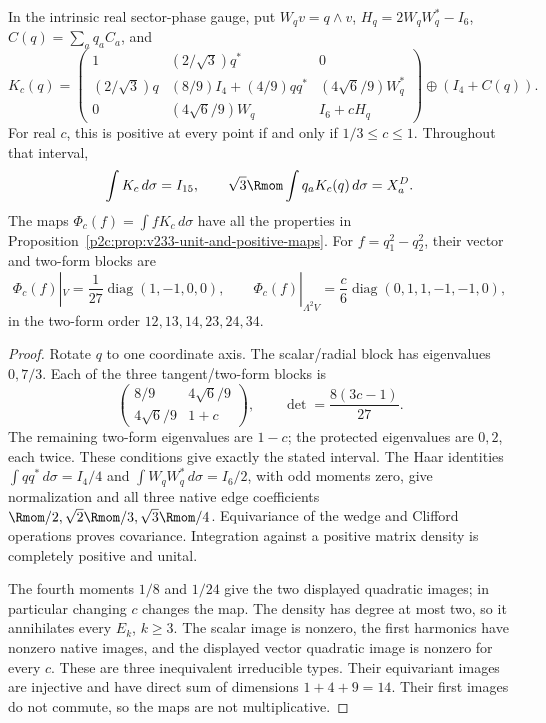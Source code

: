 \documentclass[11pt,a4paper]{article}
\begin{document}
\begin{proposition}
\label{p2c:prop:v233-endpoint-map-family}
In the intrinsic real sector-phase gauge, put
\(W_qv=q\wedge v\), \(H_q=2W_qW_q^*-I_6\),
\(C(q)=\sum_aq_aC_a\), and
\[
 K_c(q)=
 \begin{pmatrix}
 1&(2/\sqrt3)q^*&0\\
 (2/\sqrt3)q&(8/9)I_4+(4/9)qq^*&(4\sqrt6/9)W_q^*\\
 0&(4\sqrt6/9)W_q&I_6+cH_q
 \end{pmatrix}\oplus(I_4+C(q)).
\]
For real \(c\), this is positive at every point if and only if
\(1/3\le c\le1\). Throughout that interval,
\[
 \int K_c\,d\sigma=I_{15},\qquad
 \sqrt3\Rmom\int q_aK_c(q)\,d\sigma=X_a^D .
\]
The maps \(\Phi_c(f)=\int fK_c\,d\sigma\) have all the properties
in Proposition~\ref{p2c:prop:v233-unit-and-positive-maps}.
For \(f=q_1^2-q_2^2\), their vector and two-form blocks are
\[
 \Phi_c(f)|_V=\frac1{27}\operatorname{diag}(1,-1,0,0),\qquad
 \Phi_c(f)|_{\Lambda^2V}
 =\frac c6\operatorname{diag}(0,1,1,-1,-1,0),
\]
in the two-form order \(12,13,14,23,24,34\).
\end{proposition}
\begin{proof}
Rotate \(q\) to one coordinate axis. The scalar/radial block has
eigenvalues \(0,7/3\). Each of the three tangent/two-form blocks is
\[
 \begin{pmatrix}8/9&4\sqrt6/9\\4\sqrt6/9&1+c\end{pmatrix},
 \qquad \det=\frac{8(3c-1)}{27}.
\]
The remaining two-form eigenvalues are \(1-c\); the protected
eigenvalues are \(0,2\), each twice. These conditions give exactly
the stated interval. The Haar identities
\(\int qq^*\,d\sigma=I_4/4\) and
\(\int W_qW_q^*\,d\sigma=I_6/2\), with odd moments zero,
give normalization and all three native edge coefficients
\(\Rmom/2,\sqrt2\Rmom/3,\sqrt3\Rmom/4\).
Equivariance of the wedge and Clifford operations proves covariance.
Integration against a positive matrix density is completely
positive and unital.

The fourth moments \(1/8\) and \(1/24\) give the two displayed
quadratic images; in particular changing \(c\) changes the map.
The density has degree at most two, so it annihilates every
\(E_k\), \(k\ge3\). The scalar image is nonzero, the first
harmonics have nonzero native images, and the displayed vector
quadratic image is nonzero for every \(c\). These are three
inequivalent irreducible types. Their equivariant images are
injective and have direct sum of dimensions \(1+4+9=14\).
Their first images do not commute, so the maps are not
multiplicative.
\end{proof}
\end{document}
